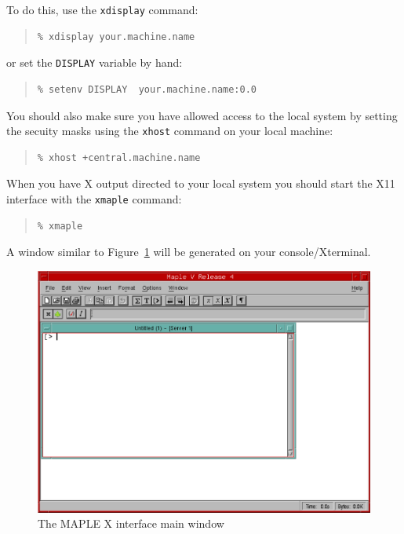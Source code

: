 \documentclass[twoside,11pt]{article}
\newenvironment{latexonly}{}{}
\begin{document}
To do this, use the \texttt{xdisplay} command:

\begin{quote}\begin{verbatim}
% xdisplay your.machine.name
\end{verbatim}\end{quote}

or set the \texttt{DISPLAY} variable by hand:

\begin{quote}\begin{verbatim}
% setenv DISPLAY  your.machine.name:0.0
\end{verbatim}\end{quote}

You should also make sure you have allowed access to the local system by
setting the secuity masks using the \texttt{xhost} command on your local
machine:

\begin{quote}\begin{verbatim}
% xhost +central.machine.name
\end{verbatim}\end{quote}

When you have X output directed to your local system you should start the
X11 interface with the \texttt{xmaple} command:

\begin{quote}\begin{verbatim}
% xmaple
\end{verbatim}\end{quote}

A window similar to Figure~\ref{fig_main_window} will be generated on your
console/Xterminal.

\begin{latexonly}
\begin{figure}[h]
\begin{center}
\includegraphics[scale=0.55]{sun107_f1}
\caption{The MAPLE X interface main window}
\label{fig_main_window}
\end{center}
\end{figure}
\end{latexonly}
\end{document}
